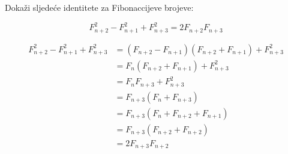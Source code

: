 \documentclass[exam.tex]{subfiles}
\begin{document}
	\begin{subtask}
		Dokaži sljedeće identitete za Fibonaccijeve brojeve:
	
		\[ F^2_{n + 2} - F^2_{n + 1} + F^2_{n + 3} = 2 F_{n + 2} F_{n + 3} \]
	\end{subtask}
	\begin{align*}
		F^2_{n + 2} - F^2_{n + 1} + F^2_{n + 3} &= (F_{n + 2} - F_{n + 1})(F_{n + 2} + F_{n + 1}) + F^2_{n + 3} \\
		&= F_n (F_{n + 2} + F_{n + 1}) + F^2_{n + 3} \\
		&= F_n F_{n + 3} + F^2_{n + 3} \\
		&= F_{n + 3} ( F_n + F_{n + 3} ) \\
		&= F_{n + 3} ( F_n + F_{n + 2} + F_{n + 1} ) \\
		&= F_{n + 3} ( F_{n + 2} + F_{n + 2} ) \\
		&= 2 F_{n + 3} F_{n + 2} 
	\end{align*}
\end{document}
